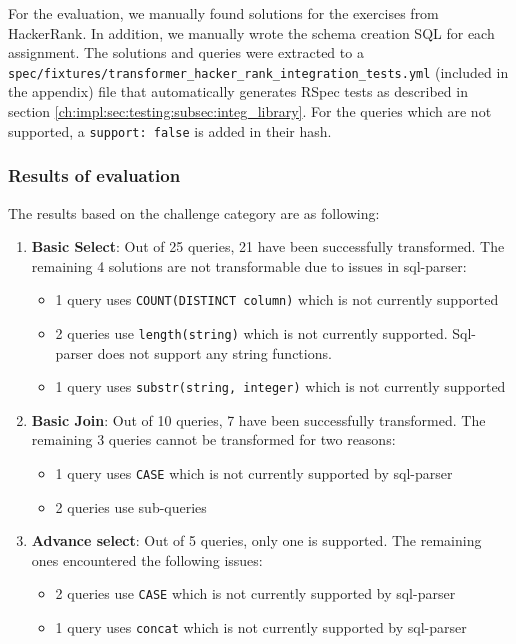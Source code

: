 For the evaluation, we manually found solutions for the exercises from HackerRank. In addition, we manually wrote the schema creation SQL for each assignment. The solutions and queries were extracted to a \texttt{spec/fixtures/transformer\_hacker\_rank\_integration\_tests.yml} (included in the appendix) file that automatically generates RSpec tests as described in section \ref{ch:impl:sec:testing:subsec:integ_library}. For the queries which are not supported, a \texttt{support: false} is added in their hash.

\subsubsection{Results of evaluation}
The results based on the challenge category are as following:
\begin{enumerate}
    \item \textbf{Basic Select}: Out of 25 queries, 21 have been successfully transformed. The remaining 4 solutions are not transformable due to issues in sql-parser:
    \begin{itemize}
        \item 1 query uses \texttt{COUNT(DISTINCT column)} which is not currently supported
        \item 2 queries use \texttt{length(string)} which is not currently supported. Sql-parser does not support any string functions.
        \item 1 query uses \texttt{substr(string, integer)} which is not currently supported
    \end{itemize}
    \item \textbf{Basic Join}: Out of 10 queries, 7 have been successfully transformed. The remaining 3 queries cannot be transformed for two reasons:
    \begin{itemize}
        \item 1 query uses \texttt{CASE} which is not currently supported by sql-parser
        \item 2 queries use sub-queries
    \end{itemize}
    \item \textbf{Advance select}: Out of 5 queries, only one is supported. The remaining ones encountered the following issues:
    \begin{itemize}
        \item 2 queries use \texttt{CASE} which is not currently supported by sql-parser
        \item 1 query uses \texttt{concat} which is not currently supported by sql-parser

\end{itemize}
\end{enumerate}
